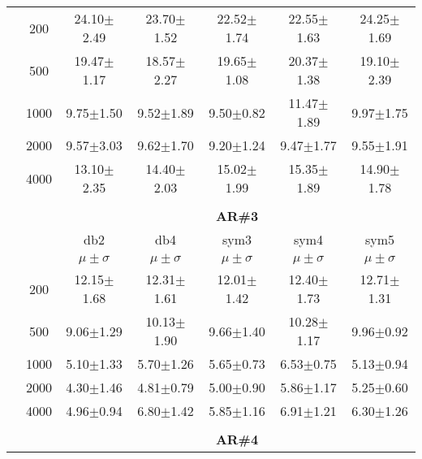 \begin{table}[H]
\begin{tabular}{|c|c|c c c c c|}
\multicolumn{1}{|c|}{ \multirow{5}{*}{\rotatebox[origin=c]{90}{\textbf{Neurônios}}} }
&200	&24.10$\pm$2.49	&23.70$\pm$1.52	&22.52$\pm$1.74	&22.55$\pm$1.63	&24.25$\pm$1.69	\\\cline{2-7}
&500	&19.47$\pm$1.17	&18.57$\pm$2.27	&19.65$\pm$1.08	&20.37$\pm$1.38	&19.10$\pm$2.39	\\\cline{2-7}
&1000	&9.75$\pm$1.50	&9.52$\pm$1.89	&9.50$\pm$0.82	&11.47$\pm$1.89	&9.97$\pm$1.75	\\\cline{2-7}
&2000	&9.57$\pm$3.03	&9.62$\pm$1.70	&9.20$\pm$1.24	&9.47$\pm$1.77	&9.55$\pm$1.91	\\\cline{2-7}
&4000	&13.10$\pm$2.35	&14.40$\pm$2.03	&15.02$\pm$1.99	&15.35$\pm$1.89	&14.90$\pm$1.78	
	


\\ \midrule
\multicolumn{7}{c}{}\\ 



\cline{3-7}
\multicolumn{2}{c|}{\multirow{3}{*}{}} & \multicolumn{5}{c|}{\textbf{AR\#3}}   \\\cline{3-7} 

\multicolumn{2}{c|}{}  & db2 & db4 & sym3 & sym4 & sym5 \\\cline{3-7}
\multicolumn{2}{c|}{}& $\mu \pm \sigma$ & $\mu \pm \sigma$ & $\mu \pm \sigma$ & $\mu \pm \sigma$ & $\mu \pm \sigma$ \\\hline

\multicolumn{1}{|c|}{ \multirow{5}{*}{\rotatebox[origin=c]{90}{\textbf{Neurônios}}} }
&200	&12.15$\pm$1.68	&12.31$\pm$1.61	&12.01$\pm$1.42	&12.40$\pm$1.73	&12.71$\pm$1.31	\\\cline{2-7}
&500	&9.06$\pm$1.29	&10.13$\pm$1.90	&9.66$\pm$1.40	&10.28$\pm$1.17	&9.96$\pm$0.92	\\\cline{2-7}
&1000	&5.10$\pm$1.33	&5.70$\pm$1.26	&5.65$\pm$0.73	&6.53$\pm$0.75	&5.13$\pm$0.94	\\\cline{2-7}
&2000	&4.30$\pm$1.46	&4.81$\pm$0.79	&5.00$\pm$0.90	&5.86$\pm$1.17	&5.25$\pm$0.60	\\\cline{2-7}
&4000	&4.96$\pm$0.94	&6.80$\pm$1.42	&5.85$\pm$1.16	&6.91$\pm$1.21	&6.30$\pm$1.26	



\\\midrule 
\multicolumn{7}{c}{}\\ 



\cline{3-7}
\multicolumn{2}{c|}{\multirow{3}{*}{}} & \multicolumn{5}{c|}{\textbf{AR\#4}}   \\\cline{3-7} 


\end{tabular}
\end{table}
